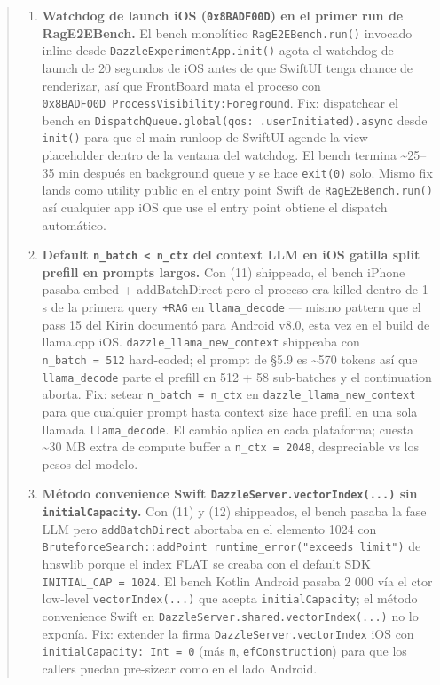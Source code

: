 \begin{quote}
\begin{enumerate}
  wall clock total para Phase 2b ≈ 8 hr 50 min.
\item
  \textbf{Watchdog de launch iOS (\texttt{0x8BADF00D}) en el primer run de
  RagE2EBench.} El bench monolítico \texttt{RagE2EBench.run()} invocado inline
  desde \texttt{DazzleExperimentApp.init()} agota el watchdog de launch de 20
  segundos de iOS antes de que SwiftUI tenga chance de renderizar, así que
  FrontBoard mata el proceso con
  \texttt{0x8BADF00D\ ProcessVisibility:Foreground}. Fix: dispatchear el bench
  en \texttt{DispatchQueue.global(qos:\ .userInitiated).async} desde
  \texttt{init()} para que el main runloop de SwiftUI agende la view placeholder
  dentro de la ventana del watchdog. El bench termina \textasciitilde25--35 min
  después en background queue y se hace \texttt{exit(0)} solo. Mismo fix lands
  como utility public en el entry point Swift de \texttt{RagE2EBench.run()} así
  cualquier app iOS que use el entry point obtiene el dispatch automático.
\item
  \textbf{Default \texttt{n\_batch\ \textless{}\ n\_ctx} del context LLM en iOS
  gatilla split prefill en prompts largos.} Con (11) shippeado, el bench iPhone
  pasaba embed + addBatchDirect pero el proceso era killed dentro de 1 s de la
  primera query \texttt{+RAG} en \texttt{llama\_decode} --- mismo pattern que el
  pass 15 del Kirin documentó para Android v8.0, esta vez en el build de
  llama.cpp iOS. \texttt{dazzle\_llama\_new\_context} shippeaba con
  \texttt{n\_batch\ =\ 512} hard-coded; el prompt de §5.9 es \textasciitilde570
  tokens así que \texttt{llama\_decode} parte el prefill en 512 + 58 sub-batches
  y el continuation aborta. Fix: setear \texttt{n\_batch\ =\ n\_ctx} en
  \texttt{dazzle\_llama\_new\_context} para que cualquier prompt hasta context
  size hace prefill en una sola llamada \texttt{llama\_decode}. El cambio aplica
  en cada plataforma; cuesta \textasciitilde30 MB extra de compute buffer a
  \texttt{n\_ctx\ =\ 2048}, despreciable vs los pesos del modelo.
\item
  \textbf{Método convenience Swift \texttt{DazzleServer.vectorIndex(...)} sin
  \texttt{initialCapacity}.} Con (11) y (12) shippeados, el bench pasaba la fase
  LLM pero \texttt{addBatchDirect} abortaba en el elemento 1024 con
  \texttt{BruteforceSearch::addPoint\ runtime\_error("exceeds\ limit")} de
  hnswlib porque el index FLAT se creaba con el default SDK
  \texttt{INITIAL\_CAP\ =\ 1024}. El bench Kotlin Android pasaba 2 000 vía el
  ctor low-level \texttt{vectorIndex(...)} que acepta \texttt{initialCapacity};
  el método convenience Swift en \texttt{DazzleServer.shared.vectorIndex(...)}
  no lo exponía. Fix: extender la firma \texttt{DazzleServer.vectorIndex} iOS
  con \texttt{initialCapacity:\ Int\ =\ 0} (más \texttt{m},
  \texttt{efConstruction}) para que los callers puedan pre-sizear como en el
  lado Android.
\end{enumerate}


\end{quote}
